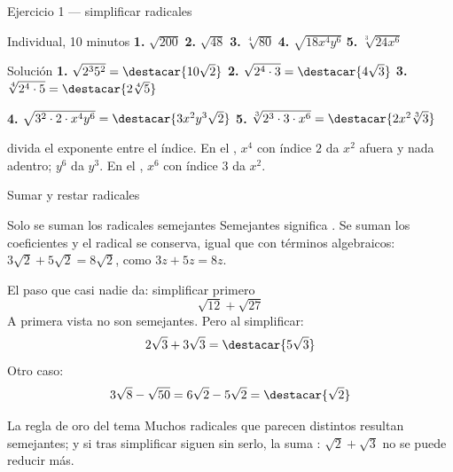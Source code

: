 \documentclass[aspectratio=169,10pt]{beamer}
\begin{document}
\begin{frame}{Ejercicio 1 — simplificar radicales}
  \scriptsize
  \begin{alertblock}{Individual, 10 minutos}
    \tiny
    \textbf{1.} $\sqrt{200}$ \qquad
    \textbf{2.} $\sqrt{48}$ \qquad
    \textbf{3.} $\sqrt[4]{80}$ \qquad
    \textbf{4.} $\sqrt{18x^{4}y^{6}}$ \qquad
    \textbf{5.} $\sqrt[3]{24x^{6}}$
  \end{alertblock}

  \vspace{0.06cm}
  \begin{block}{Solución}
    \tiny
    \textbf{1.} $\sqrt{2^{3}5^{2}} = \destacar{10\sqrt{2}}$ \qquad
    \textbf{2.} $\sqrt{2^{4}\cdot 3} = \destacar{4\sqrt{3}}$ \qquad
    \textbf{3.} $\sqrt[4]{2^{4}\cdot 5} = \destacar{2\sqrt[4]{5}}$

    \vspace{0.08cm}
    \textbf{4.} $\sqrt{3^{2}\cdot 2\cdot x^{4}y^{6}}
    = \destacar{3x^{2}y^{3}\sqrt{2}}$ \qquad
    \textbf{5.} $\sqrt[3]{2^{3}\cdot 3\cdot x^{6}}
    = \destacar{2x^{2}\sqrt[3]{3}}$
  \end{block}

  \vspace{0.05cm}
  {\tiny\color{uniGris}  divida el exponente
  entre el índice. En el , $x^{4}$ con índice $2$ da $x^{2}$
  afuera y nada adentro; $y^{6}$ da $y^{3}$. En el , $x^{6}$ con
  índice $3$ da $x^{2}$.}
\end{frame}

\begin{frame}{Sumar y restar radicales}
  \scriptsize
  \begin{block}{Solo se suman los radicales semejantes}
    \tiny
    Semejantes significa . Se suman
    los coeficientes y el radical se conserva, igual que con términos
    algebraicos: $3\sqrt{2}+5\sqrt{2} = 8\sqrt{2}$, como $3z+5z=8z$.
  \end{block}

  \vspace{0.1cm}
  \begin{exampleblock}{El paso que casi nadie da: simplificar primero}
    \tiny
    \[ \sqrt{12}+\sqrt{27} \]
    A primera vista no son semejantes. Pero al simplificar:
    \[ 2\sqrt{3}+3\sqrt{3} = \destacar{5\sqrt{3}} \]
    Otro caso:
    \[ 3\sqrt{8}-\sqrt{50} = 6\sqrt{2}-5\sqrt{2} = \destacar{\sqrt{2}} \]
  \end{exampleblock}

  \vspace{0.0cm}
  \begin{alertblock}{La regla de oro del tema}
    \tiny
     Muchos radicales que parecen distintos resultan
    semejantes; y si tras simplificar siguen sin serlo, la suma
    : $\sqrt{2}+\sqrt{3}$ no se puede reducir más.
  \end{alertblock}
\end{frame}
\end{document}
